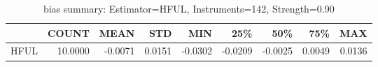 \begin{table}[ht]
\centering
\caption{bias summary: Estimator=HFUL, Instruments=142, Strength=0.90}
\begin{tabular}{lrrrrrrrr}
\toprule
 & COUNT & MEAN & STD & MIN & 25\% & 50\% & 75\% & MAX \\
\midrule
HFUL & 10.0000 & -0.0071 & 0.0151 & -0.0302 & -0.0209 & -0.0025 & 0.0049 & 0.0136 \\
\bottomrule
\end{tabular}
\end{table}

